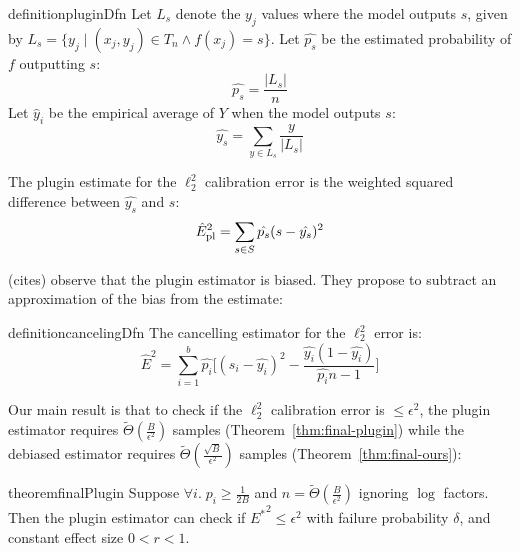 \begin{restatable}{definition}{pluginDfn}
\label{dfn:plugin-estimator}
  Let $L_s$ denote the $y_j$ values where the model outputs $s$, given by $L_s = \{ y_j \; | \; (x_j, y_j) \in T_n\wedge f(x_j) = s \}$. Let $\hat{p_s}$ be the estimated probability of $f$ outputting $s$:
\[ \hat{p_s} = \frac{|L_s|}{n} \]
Let $\hat y_i$ be the empirical average of $Y$ when the model outputs $s$:
\[ \hat{y_s} = \sum_{y \in L_s} \frac{y}{|L_s|} \] 

  The plugin estimate for the $\ell_2^2$ calibration error is the weighted squared difference between $\hat{y_s}$ and $s$:
\[ \hat{E}_{\textup{pl}}^2{} = \sum_{s \in S} \hat{p_s} (s - \hat{y_s})^2 \]
\end{restatable}

(cites) observe that the plugin estimator is biased. They propose to subtract an approximation of the bias from the estimate:

\begin{restatable}{definition}{cancelingDfn}
The cancelling estimator for the $\ell_2^2$ error is:
\[ \hat{E}^2 = \sum_{i=1}^b \hat{p_i} \Big[ (s_i - \hat{y_i})^2 - \frac{\hat{y_i}(1 - \hat{y_i})}{\hat{p_i}n-1} \Big] \]
\end{restatable}

Our main result is that to check if the $\ell_2^2$ calibration error is $\leq \epsilon^2$, the plugin estimator requires $\widetilde{\Theta}(\frac{B}{\epsilon^2})$ samples (Theorem~\ref{thm:final-plugin}) while the debiased estimator requires $\widetilde{\Theta}(\frac{\sqrt{B}}{\epsilon^2})$ samples (Theorem~\ref{thm:final-ours}): 

\begin{restatable}{theorem}{finalPlugin}
\label{thm:final-plugin}
  Suppose  $\forall i.\;p_i \geq \frac{1}{2B}$ and $n = \widetilde{\Theta}(\frac{B}{\epsilon^2})$ ignoring $\log$ factors. Then the plugin estimator can check if ${E^*}^2 \leq \epsilon^2$ with failure probability $\delta$, and constant effect size $0 < r < 1$. 
\end{restatable}

